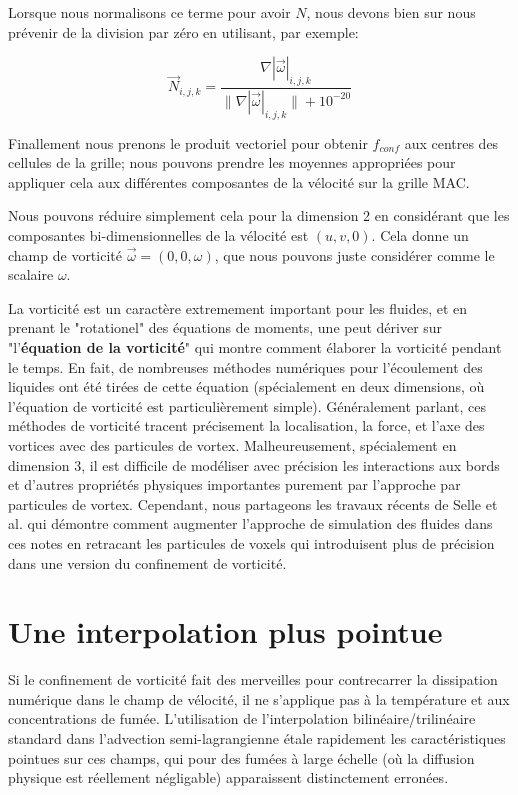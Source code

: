 \documentclass[11pt]{report}
\begin{document}
Lorsque nous normalisons ce terme pour avoir $N$, nous devons bien sur nous prévenir de la division par zéro en utilisant, par exemple:

\begin{equation}
\overrightarrow{N}_{i,j,k} = \frac{\nabla |\overrightarrow{\omega}|_{i,j,k}}{\| \nabla |\overrightarrow{\omega}|_{i,j,k} \| + 10^{-20}}
\end{equation}

Finallement nous prenons le produit vectoriel pour obtenir $f_{conf}$ aux centres des cellules de la grille; nous pouvons prendre les moyennes appropriées pour appliquer cela aux différentes composantes de la vélocité sur la grille MAC. \newline

Nous pouvons réduire simplement cela pour la dimension 2 en considérant que les composantes bi-dimensionnelles de la vélocité est $(u,v,0)$. Cela donne un champ de vorticité $\overrightarrow{\omega} = (0,0,\omega)$, que nous pouvons juste considérer comme le scalaire $\omega$. \newline

La vorticité est un caractère extremement important pour les fluides, et en prenant le "rotationel" des équations de moments, une peut dériver sur "l'\textbf{équation de la vorticité}" qui montre comment élaborer la vorticité pendant le temps. En fait, de nombreuses méthodes numériques pour l'écoulement des liquides ont été tirées de cette équation (spécialement en deux dimensions, où l'équation de vorticité est particulièrement simple). Généralement parlant, ces méthodes de vorticité tracent précisement la localisation, la force, et l'axe des vortices avec des particules de vortex. Malheureusement, spécialement en dimension 3, il est difficile de modéliser avec précision les interactions aux bords et d'autres propriétés physiques importantes purement par l'approche par particules de vortex. Cependant, nous partageons les travaux récents de Selle et al. \cite{Selle-2005} qui démontre comment augmenter l'approche de simulation des fluides dans ces notes en retracant les particules de voxels qui introduisent plus de précision dans une version du confinement de vorticité. \newline

\section{Une interpolation plus pointue} 

Si le confinement de vorticité fait des merveilles pour contrecarrer la dissipation numérique dans le champ de vélocité, il ne s'applique pas à la température et aux concentrations de fumée. L'utilisation de l'interpolation bilinéaire/trilinéaire standard  dans l'advection semi-lagrangienne étale rapidement les caractéristiques pointues sur ces champs, qui pour des fumées à large échelle (où la diffusion physique est réellement négligable) apparaissent distinctement erronées.\newline
\end{document}

